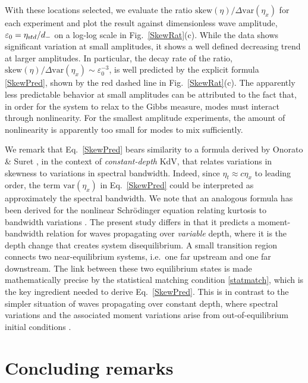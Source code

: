 \documentclass[11pt]{article}
\newcommand{\new}[1]{{ #1}}
\newcommand{\eps}{\varepsilon}
\newcommand{\etastd}{\eta_{\text std}}
\newcommand{\depth}{d}
\newcommand{\dup}{\depth_{-}}
\newcommand{\skw}{\text{skew}}
\newcommand{\var}{\text{var}}
\newcommand{\epsup}{\eps_0}
\begin{document}
	With these locations selected, we evaluate the ratio $\skw(\eta) / \Delta \var(\eta_x)$ for each experiment and plot the result against dimensionless wave amplitude, $\epsup = \etastd / \dup$ on a log-log scale in Fig.~\ref{SkewRat}(c). While the data shows significant variation at small amplitudes, it shows a well defined decreasing trend at larger amplitudes. \new{In particular, the decay rate of the ratio, $\skw(\eta) / \Delta \var(\eta_x) \sim \epsup^{-3}$, is well predicted by the explicit formula \eqref{SkewPred}, shown by the red dashed line in Fig.~\ref{SkewRat}(c).
The apparently less predictable behavior at small amplitudes can be attributed to the fact that, in order for the system to relax to the Gibbs measure, modes must interact through nonlinearity. For the smallest amplitude experiments, the amount of nonlinearity is apparently too small for  modes to mix sufficiently.}

	\new{We remark that Eq.~\eqref{SkewPred} bears similarity to a formula derived by Onorato \& Suret \cite{onorato2016twenty}, in the context of {\em constant-depth} KdV, that relates variations in skewness to variations in spectral bandwidth. Indeed, since $\eta_t \approx c \eta_x$ to leading order, the term $\var(\eta_x)$ in Eq.~\eqref{SkewPred} could be interpreted as approximately the spectral bandwidth. We note that an analogous formula has been derived for the nonlinear Schr{\"o}dinger equation relating kurtosis to bandwidth variations \cite{onorato2016origin}. The present study differs in that it predicts a moment-bandwidth relation for waves propagating over {\em variable} depth, where it is the depth change that creates system disequilibrium. A small transition region connects two near-equilibrium systems, i.e.~one far upstream and one far downstream. The link between these two equilibrium states is made mathematically precise by the statistical matching condition \eqref{statmatch}, which is the key ingredient needed to derive Eq.~\eqref{SkewPred}. This is in contrast to the simpler situation of waves propagating over constant depth, where spectral variations and the associated moment variations arise from out-of-equilibrium initial conditions \cite{onorato2016twenty, onorato2016origin}.}



\section{Concluding remarks}
\label{conclusion}
\end{document}
